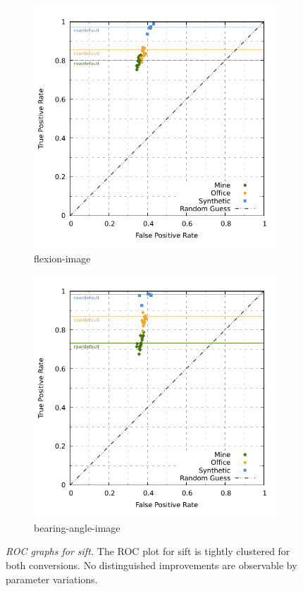 \begin{figure}[ht]
\begin{subfigure}[t]{0.45\linewidth}
    \includegraphics[width=\linewidth]{chapter06/results/SIFT/flexion/roc.pdf}%
    \caption{\gls{flexion-image}}
\end{subfigure}\quad
\begin{subfigure}[t]{0.45\linewidth}
    \includegraphics[width=\linewidth]{chapter06/results/SIFT/bearing/roc.pdf}
    \caption{\gls{bearing-angle-image}}
\end{subfigure}
\caption[\acrshort{ROC} graphs for \acrshort{sift}]{\emph{\acrshort{ROC} graphs for \acrshort{sift}.} The \acrshort{ROC} plot for \acrshort{sift} is tightly clustered for both conversions. No distinguished improvements are observable by parameter variations.}\label{fig:roc_sift}
\end{figure}
\vspace{-10mm}
